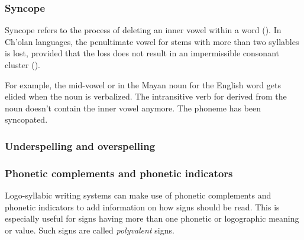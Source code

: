 \documentclass[../main.tex]{subfiles}
\begin{document}
\subsubsection{Syncope}
Syncope refers to the process of deleting an inner vowel within a word (\cite[469]{crystal2008}).
In Ch'olan languages, the penultimate vowel for stems with more than two syllables is lost, 
provided that the loss does not result in an impermissible 
consonant cluster (\cite[86]{kaufman1984}).

For example, the mid-vowel  or  in the Mayan noun  
for the English word  gets elided when the noun is verbalized.
The intransitive verb  for  derived from the 
noun  doesn't contain the inner vowel anymore.
The phoneme has been syncopated.

\subsubsection{Underspelling and overspelling}

\subsubsection{Phonetic complements and phonetic indicators}
Logo-syllabic writing systems can make use of phonetic complements and phonetic indicators to
add information on how signs should be read.
This is especially useful for signs having more than one phonetic or logographic meaning or value.
Such signs are called \emph{polyvalent} signs.
\end{document}
